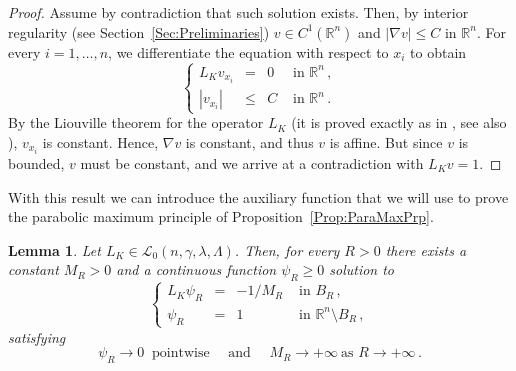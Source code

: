 \documentclass[12pt,reqno]{amsart}
\newtheorem{lemma}[theorem]{Lemma}
\theoremstyle{definition}
\theoremstyle{remark}
\newcommand{\con}[1]{\mathbb{#1}}
\newcommand{\R}{\con{R}} %
\newcommand{\lcal}{\mathcal{L}}
\newcommand{\s}{\gamma}
\newcommand\beqc[1]{\left\{\begin{array}{#1}}
\newcommand\eeqc{\end{array} \right.}
\def\PDEsystem{rcll}
\numberwithin{equation}{section}
\begin{document}
\begin{proof}
	Assume by contradiction that such solution exists. Then, by interior regularity (see Section~\ref{Sec:Preliminaries}) $v\in C^1(\R^n)$ and $|\nabla v|\leq C$ in $\R^n$. For every $i = 1,\ldots, n$, we differentiate the equation with respect to $x_i$ to obtain
	\begin{equation*}
	\beqc{\PDEsystem}
	L_K  v_{x_i} &=& 0 & \textrm{ in } \R^n\,,\\
	|v_{x_i}| &\leq& C & \textrm{ in } \R^n\,.
	\eeqc
	\end{equation*}
	By the Liouville theorem for the operator $L_K $ (it is proved exactly as in \cite{RosOtonSerra-Stable}, see also \cite{SerraC2s+alphaRegularity}), $v_{x_i}$ is constant. Hence, $\nabla v$ is constant, and thus $v$ is affine. But since $v$ is bounded, $v$ must be constant, and we arrive at a contradiction with $L_K v=1$.
\end{proof}

With this result we can introduce the auxiliary function that we will use to prove the parabolic maximum principle of Proposition~\ref{Prop:ParaMaxPrp}.

\begin{lemma}
	\label{Lemma:SolBallToZero}
	Let $L_K \in \lcal_0(n,\s,\lambda, \Lambda)$. Then, for every $R>0$ there exists a constant $M_R>0$ and a continuous function $\psi_R\geq 0$ solution to
	\begin{equation}
	\label{Eq:psiRProblem}
	\beqc{\PDEsystem}
	L_K  \psi_R &=& -1/M_R & \textrm{ in } B_R\,,\\
	\psi_R &=& 1 & \textrm{ in } \R^n\setminus B_R\,,
	\eeqc
	\end{equation}
	satisfying 
	$$
	\psi_R \to  0 \ \text{ pointwise } \quad \text{and } \quad M_R  \to +\infty \ \text{as } R\to +\infty\,.
	$$
\end{lemma}
\end{document}

